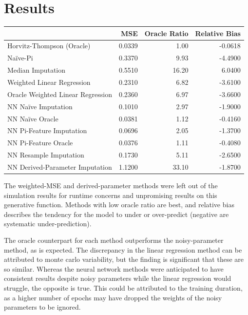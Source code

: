 \documentclass[12pt,twoside]{reedthesis}
\begin{document}
\section{Results}\label{sim_results}
\begin{table}[H]
\centering
\begin{tabular}{l|r|r|r}
\hline
  & MSE & Oracle Ratio & Relative Bias\\
\hline
Horvitz-Thompson (Oracle) & 0.0339 & 1.00 & -0.0618\\
\hline
Naïve-Pi & 0.3370 & 9.93 & -4.4900\\
\hline
Median Imputation & 0.5510 & 16.20 & 6.0400\\
\hline
Weighted Linear Regression & 0.2310 & 6.82 & -3.6100\\
\hline
Oracle Weighted Linear Regression & 0.2360 & 6.97 & -3.6600\\
\hline
NN  Naïve Imputation & 0.1010 & 2.97 & -1.9000\\
\hline
NN Naïve Oracle & 0.0381 & 1.12 & -0.4160\\
\hline
NN Pi-Feature Imputation & 0.0696 & 2.05 & -1.3700\\
\hline
NN Pi-Feature Oracle & 0.0376 & 1.11 & -0.4080\\
\hline
NN Resample Imputation & 0.1730 & 5.11 & -2.6500\\
\hline
NN Derived-Parameter Imputation & 1.1200 & 33.10 & -1.8700\\
\hline
\end{tabular}
\end{table}
The weighted-MSE and derived-parameter methods were left out of the
simulation results for runtime concerns and unpromising results on this
generative function. Methods with low oracle ratio are best, and
relative bias describes the tendency for the model to under or
over-predict (negative are systematic under-prediction).

The oracle counterpart for each method outperforms the noisy-parameter
method, as is expected. The discrepancy in the linear regression method
can be attributed to monte carlo variability, but the finding is
significant that these are so similar. Whereas the neural network
methods were anticipated to have consistent results despite noisy
parameters while the linear regression would struggle, the opposite is
true. This could be attributed to the training duration, as a higher
number of epochs may have dropped the weights of the noisy parameters to
be ignored.
\end{document}
